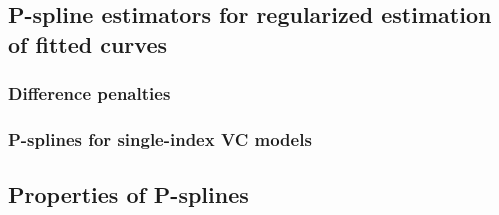 \documentclass[12pt]{article}
\theoremstyle{definition}
\begin{document}





\subsection{P-spline estimators for regularized estimation of fitted curves}



 
 \subsubsection{Difference penalties}
 



\subsubsection{P-splines for single-index VC models}
 


\subsection{Properties of P-splines}
 


\end{document}

